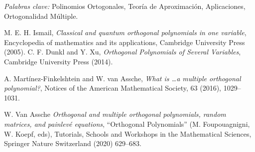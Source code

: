 \documentclass[11pt,a4paper]{amsart}
\begin{document}


\bigskip
\bigskip


\noindent
\textit{Palabras clave:} Polinomios Ortogonales, Teoría de Aproximación, Aplicaciones, Ortogonalidad Múltiple.








\begin{thebibliography}{99}

     M. E. H. Ismail,
     \emph{Classical and quantum orthogonal polynomials in one variable}, Encyclopedia of mathematics and its applications, Cambridge University Press (2005). 
     C. F. Dunkl and Y. Xu,
     \emph{Orthogonal Polynomials of Several Variables}, Cambridge University Press (2014).

     A. Martínez-Finkelshtein and W. van Assche,
     \emph{What is \dots a multiple orthogonal polynomial?}, Notices of the American Mathematical Society, 63 (2016), 1029--1031.

     W. Van Assche
     \emph{Orthogonal and multiple orthogonal polynomials, random matrices, and painlevé equations}, ``Orthogonal Polynomials'' (M. Foupouagnigni, W. Koepf, eds), Tutorials, Schools and Workshops in the Mathematical Sciences, Springer Nature Switzerland (2020) 629--683.
     
\end{thebibliography}
\end{document}
